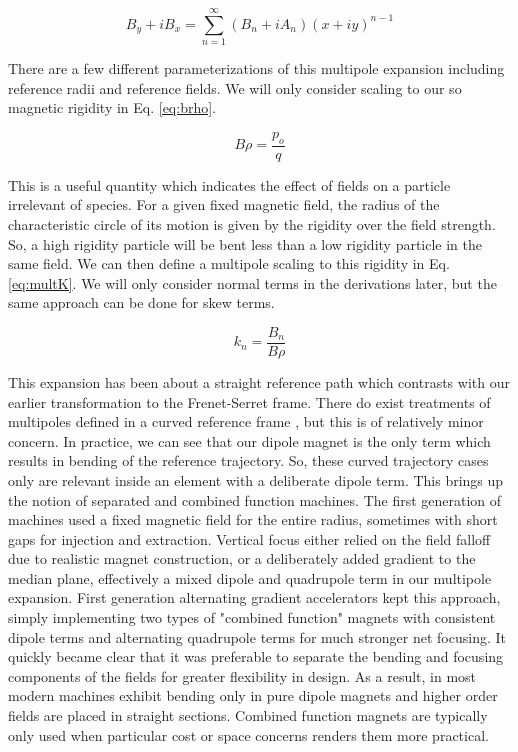 \begin{equation} \label{eq:mult}
	B_y + iB_x = \sum_{n=1}^{\infty} (B_n + iA_n) (x + iy)^{n-1}
\end{equation}

There are a few different parameterizations of this multipole expansion including reference radii and reference fields. We will only consider scaling to our so magnetic rigidity in Eq. \ref{eq:brho}. 

\begin{equation} \label{eq:brho}
	B\rho = \frac{p_o}{q}
\end{equation}

This is a useful quantity which indicates the effect of fields on a particle irrelevant of species. For a given fixed magnetic field, the radius of the characteristic circle of its motion is given by the rigidity over the field strength. So, a high rigidity particle will be bent less than a low rigidity particle in the same field. We can then define a multipole scaling to this rigidity in Eq. \ref{eq:multK}. We will only consider normal terms in the derivations later, but the same approach can be done for skew terms.

\begin{equation} \label{eq:multK}
	k_n = \frac{B_n}{B\rho}
\end{equation}

This expansion has been about a straight reference path which contrasts with our earlier transformation to the Frenet-Serret frame. There do exist treatments of multipoles defined in a curved reference frame \cite{ZolkinMultipole}, but this is of relatively minor concern. In practice, we can see that our dipole magnet is the only term which results in bending of the reference trajectory. So, these curved trajectory cases only are relevant inside an element with a deliberate dipole term. This brings up the notion of separated and combined function machines. The first generation of machines used a fixed magnetic field for the entire radius, sometimes with short gaps for injection and extraction. Vertical focus either relied on the field falloff due to realistic magnet construction, or a deliberately added gradient to the median plane, effectively a mixed dipole and quadrupole term in our multipole expansion. First generation alternating gradient accelerators kept this approach, simply implementing two types of "combined function" magnets with consistent dipole terms and alternating quadrupole terms for much stronger net focusing. It quickly became clear that it was preferable to separate the bending and focusing components of the fields for greater flexibility in design. As a result, in most modern machines exhibit bending only in pure dipole magnets and higher order fields are placed in straight sections. Combined function magnets are typically only used when particular cost or space concerns renders them more practical.

